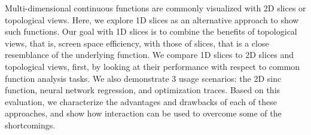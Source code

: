 Multi-dimensional continuous functions are commonly visualized with 2D slices
or topological views. Here, we explore 1D slices as an alternative approach to
show such functions. Our goal with 1D slices is to combine the benefits of
topological views, that is, screen space efficiency, with those of slices, that
is a close resemblance of the underlying function.  We compare 1D slices to 2D
slices and topological views, first, by looking at their performance with
respect to common function analysis tasks. We also demonstrate 3 usage
scenarios: the 2D sinc function, neural network regression, and optimization
traces. Based on this evaluation, we characterize the advantages and
drawbacks of each of these approaches, and show how interaction can be
used to overcome some of the shortcomings. 

